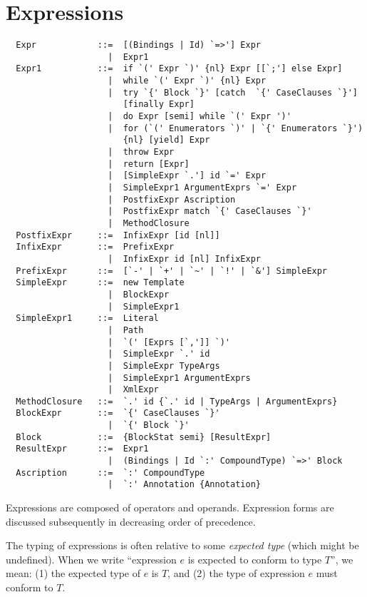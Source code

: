 \chapter{Expressions}
\label{sec:exprs}

\syntax\begin{lstlisting}
  Expr            ::=  [(Bindings | Id) `=>'] Expr
                    |  Expr1
  Expr1           ::=  if `(' Expr `)' {nl} Expr [[`;'] else Expr]
                    |  while `(' Expr `)' {nl} Expr
                    |  try `{' Block `}' [catch  `{' CaseClauses `}'] 
                       [finally Expr]
                    |  do Expr [semi] while `(' Expr ')'
                    |  for (`(' Enumerators `)' | `{' Enumerators `}') 
                       {nl} [yield] Expr
                    |  throw Expr
                    |  return [Expr]
                    |  [SimpleExpr `.'] id `=' Expr
                    |  SimpleExpr1 ArgumentExprs `=' Expr
                    |  PostfixExpr Ascription
                    |  PostfixExpr match `{' CaseClauses `}'
                    |  MethodClosure
  PostfixExpr     ::=  InfixExpr [id [nl]]
  InfixExpr       ::=  PrefixExpr
                    |  InfixExpr id [nl] InfixExpr
  PrefixExpr      ::=  [`-' | `+' | `~' | `!' | `&'] SimpleExpr 
  SimpleExpr      ::=  new Template
                    |  BlockExpr
                    |  SimpleExpr1
  SimpleExpr1     ::=  Literal
                    |  Path
                    |  `(' [Exprs [`,']] `)'
                    |  SimpleExpr `.' id 
                    |  SimpleExpr TypeArgs
                    |  SimpleExpr1 ArgumentExprs
                    |  XmlExpr
  MethodClosure   ::=  `.' id {`.' id | TypeArgs | ArgumentExprs}
  BlockExpr       ::=  `{' CaseClauses `}'
                    |  `{' Block `}'
  Block           ::=  {BlockStat semi} [ResultExpr]
  ResultExpr      ::=  Expr1
                    |  (Bindings | Id `:' CompoundType) `=>' Block
  Ascription      ::=  `:' CompoundType
                    |  `:' Annotation {Annotation} 
\end{lstlisting}

Expressions are composed of operators and operands. Expression forms are
discussed subsequently in decreasing order of precedence. 

The typing of expressions is often relative to some {\em expected
type} (which might be undefined).  
When we write ``expression $e$ is expected to conform to
type $T$'', we mean: (1) the expected type of $e$ is
$T$, and (2) the type of expression $e$ must conform to
$T$.

